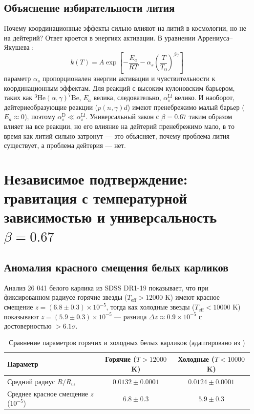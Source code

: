 \documentclass[12pt,a4paper]{article}
\theoremstyle{remark}
\newcommand{\alp}{\alpha}
\begin{document}
	\subsection{Объяснение избирательности лития}
	
	Почему координационные эффекты сильно влияют на литий в космологии, но не на дейтерий? Ответ кроется в энергиях активации. В уравнении Аррениуса–Якушева \cite{appendixC}:
	\begin{equation}
		k(T) = A \exp\left[-\frac{E_a}{RT} - \alp_s \left(\frac{T}{T_0}\right)^{\beta\gamma}\right]
		\label{eq:arrhenius_yak}
	\end{equation}
	параметр \(\alp_s\) пропорционален энергии активации и чувствительности к координационным эффектам. Для реакций с высоким кулоновским барьером, таких как \(^3\mathrm{He}(\alpha,\gamma)^7\mathrm{Be}\), \(E_a\) велика, следовательно, \(\alp_s^{\mathrm{Li}}\) велико. И наоборот, дейтериеобразующие реакции (\(p(n,\gamma)d\)) имеют пренебрежимо малый барьер (\(E_a \approx 0\)), поэтому \(\alp_s^{\mathrm{D}} \ll \alp_s^{\mathrm{Li}}\). Универсальный закон с \(\beta = 0.67\) таким образом влияет на все реакции, но его влияние на дейтерий пренебрежимо мало, в то время как литий сильно затронут — это объясняет, почему проблема лития существует, а проблема дейтерия — нет.
	
	\section{Независимое подтверждение: гравитация с температурной зависимостью и универсальность \(\beta = 0.67\)}
	\label{sec:universal-proof}
	
	\subsection{Аномалия красного смещения белых карликов}
	\label{subsec:wd-anomaly}
	
	Анализ 26 041 белого карлика из SDSS DR1-19 \cite{Crumpler2024} показывает, что при фиксированном радиусе горячие звезды (\(T_{\mathrm{eff}} > 12000\) K) имеют красное смещение \(z = (6.8 \pm 0.3) \times 10^{-5}\), тогда как холодные звезды (\(T_{\mathrm{eff}} < 10000\) K) показывают \(z = (5.9 \pm 0.3) \times 10^{-5}\) — разница \(\Delta z \approx 0.9 \times 10^{-5}\) с достоверностью \(>6.1\sigma\).
	
	\begin{table}[h]
		\centering
		\caption{Сравнение параметров горячих и холодных белых карликов (адаптировано из \cite{Crumpler2024})}
		\label{tab:wd-results}
		\begin{tabular}{lcc}
			\toprule
			\textbf{Параметр} & \textbf{Горячие (\(T>12000\) K)} & \textbf{Холодные (\(T<10000\) K)} \\
			\midrule
			Средний радиус \(R/R_\odot\) & \(0.0132 \pm 0.0001\) & \(0.0124 \pm 0.0001\) \\
			Среднее красное смещение \(z\) (\(10^{-5}\)) & \(6.8 \pm 0.3\) & \(5.9 \pm 0.3\) \\
			\bottomrule
		\end{tabular}
	\end{table}
	
\end{document}
